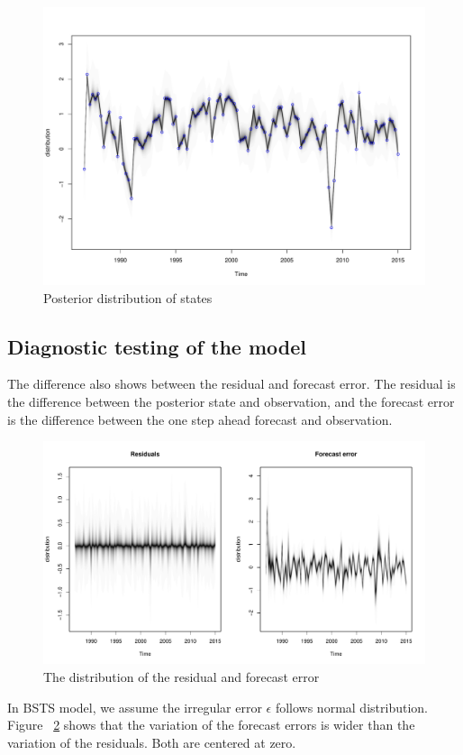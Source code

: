 \begin{figure}[ht]
	\centering
	\includegraphics[width=0.6\linewidth]{Figures/states_distribution}
	\caption{Posterior distribution of states}
	\label{fig:states_distribution}
\end{figure}



\subsection{Diagnostic testing of  the model}

The difference also shows between the residual and forecast error. The residual is the difference between the posterior state and observation, and the forecast error is the difference between the one step ahead forecast and observation. 


\begin{figure}[ht]
	\centering
	\includegraphics[width=0.8\linewidth]{Figures/residuals_prediction_errors}
	\caption{The distribution of the residual and forecast error}
	\label{fig:residuals_prediction_errors}
\end{figure}

In BSTS model, we assume the irregular error $\epsilon$ follows normal distribution. Figure  ~\ref{fig:residuals_prediction_errors} shows that the variation of the forecast errors is wider than the variation of the residuals. Both are centered at zero.  

